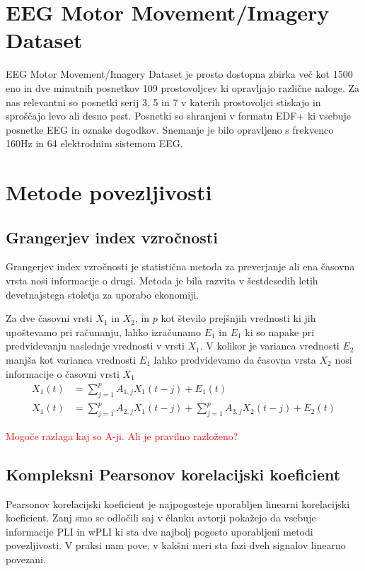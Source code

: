 \section{EEG Motor Movement/Imagery Dataset}
EEG Motor Movement/Imagery Dataset je prosto dostopna zbirka več kot 1500 eno in dve minutnih posnetkov 109 prostovoljcev ki opravljajo različne naloge. Za nas relevantni so posnetki serij 3, 5 in 7 v katerih prostovoljci stiskajo in sproščajo levo ali desno pest. Posnetki so shranjeni v formatu EDF+ ki vsebuje posnetke EEG in oznake dogodkov. Snemanje je bilo opravljeno s frekvenco 160Hz in 64 elektrodnim sistemom EEG.\cite{schalk_eeg_2009,schalk_bci2000_2004}

\section{Metode povezljivosti}
\subsection{Grangerjev index vzročnosti}
Grangerjev index vzročnosti je statistična metoda za preverjanje ali ena časovna vrsta nosi informacije o drugi. Metoda je bila razvita v šestdesedih letih devetnajstega stoletja za uporabo ekonomiji.

Za dve časovni vrsti $X_1$ in $X_2$, in $p$ kot število prejšnjih vrednosti ki jih upoštevamo pri računanju, lahko izračunamo $E_1$ in $E_1$ ki so napake pri predvidevanju naslednje vrednosti v vrsti $X_1$. V kolikor je varianca vrednosti $E_2$ manjša kot varianca vrednosti $E_1$ lahko predvidevamo da časovna vrsta $X_2$ nosi informacije o časovni vrsti $X_1$
\begin{align*}
X_1(t) &= \sum_{j=1}^{p} A_{1,j} X_1(t-j) + E_1(t)\\
X_1(t) &= \sum_{j=1}^{p} A_{2,j} X_1(t-j) + \sum_{j=1}^{p} A_{3,j} X_2(t-j) + E_2(t)
\end{align*}


\textcolor{red}{Mogoče razlaga kaj so A-ji. Ali je pravilno razloženo?}

\cite{seth_granger_2007}

\subsection{Kompleksni Pearsonov korelacijski koeficient}
Pearsonov korelacijski koeficient je najpogosteje uporabljen linearni korelacijski koeficient. Zanj smo se odločili saj v članku   avtorji pokažejo da vsebuje informacije PLI in wPLI ki sta dve najbolj pogosto uporabljeni metodi povezljivosti. V praksi nam pove, v kakšni meri sta fazi dveh signalov linearno povezani.

